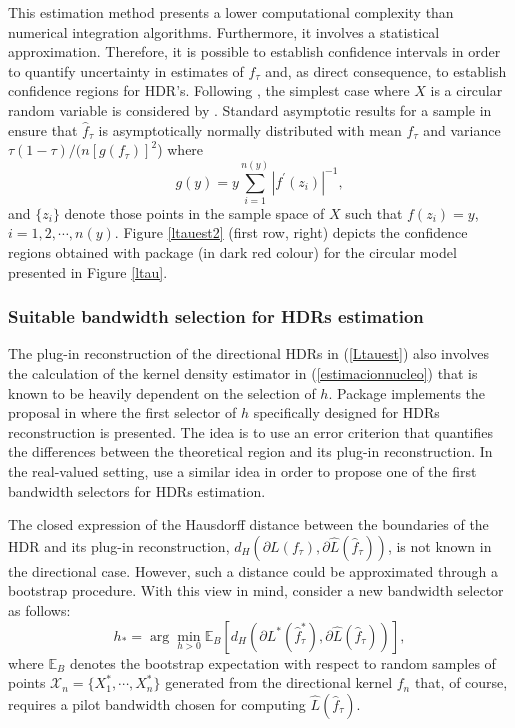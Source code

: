 This estimation method presents a lower computational complexity than numerical integration algorithms. Furthermore, it involves a statistical approximation. Therefore, it is possible to establish confidence intervals in order to quantify uncertainty in estimates of $f_{\tau}$ and, as direct consequence, to establish confidence regions for HDR's. Following \cite{hyndman1996computing}, the simplest case where $X$ is a circular random variable is considered by \cite{saavedra2020nonparametric}. Standard asymptotic results for a sample in \cite{cox1979theoretical} ensure that $\hat{f}_{\tau}$ is asymptotically normally distributed with mean $f_{\tau}$ and variance $\tau (1 - \tau)/(n[g(f_\tau)]^2$) where 
$$g(y)=y\sum_{i=1}^{n(y)}|f^{'}(z_i)|^{-1},$$and $\{z_i\}$ denote those points in the sample space of $X$ such that $f(z_i)=y$, $i=1, 2,\cdots,n(y)$.  Figure \ref{ltauest2} (first row, right) depicts the confidence regions obtained with package  (in dark red colour) for the circular model presented in Figure \ref{ltau}. 


\subsubsection{Suitable bandwidth selection for HDRs estimation}\label{h1}

The plug-in reconstruction of the directional HDRs in (\ref{Ltauest}) also involves the calculation of the kernel density estimator in (\ref{estimacionnucleo}) that is known to be heavily dependent on the selection of $h$.  Package  implements the proposal in \cite{saavedra2020nonparametric} where the first selector of $h$ specifically designed for HDRs reconstruction is presented. The idea is to use an error criterion that quantifies the differences between the theoretical region and its plug-in reconstruction. In the real-valued setting, \cite{samworth2010asymptotics} use a similar idea in order to propose one of the first bandwidth selectors for HDRs estimation.

The closed expression of the Hausdorff distance between the boundaries of the HDR and its plug-in reconstruction, $d_H(\partial L(f_\tau),\partial\hat{L}(\hat{f}_\tau))$, is not known in the directional case. However, such a distance could be approximated through a bootstrap procedure. With this view in mind, \cite{saavedra2020nonparametric} consider a new bandwidth selector as follows:
\begin{equation}
h_{*}=\arg \min_{h>0}\mathbb{E}_B\left[d_H(\partial L^{*}(\hat{f}_\tau^*),\partial \hat{L}(\hat{f}_\tau))\right],
\label{eq:h1}
\end{equation}
where $\mathbb{E}_B$ denotes the bootstrap expectation with respect to random samples of points $\mathcal X_n=\{X_1^*,\cdots,X_n^*\}$ generated from the directional kernel $f_n$ that, of course, requires a pilot bandwidth chosen for computing $\hat{L}(\hat{f}_\tau)$. 












